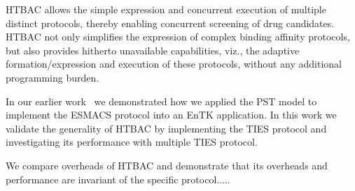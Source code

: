 HTBAC allows the simple expression and concurrent execution of multiple
distinct protocols, thereby enabling concurrent screening of drug candidates.
HTBAC not only simplifies the expression of complex binding affinity
protocols, but also provides hitherto unavailable capabilities, viz., the
adaptive formation/expression and execution of these protocols, without any
additional programming burden.

In our earlier work~\cite{dakka2017} we demonstrated how we applied the
PST model to implement the ESMACS protocol into an EnTK application. In this
work we validate the generality of HTBAC by implementing the TIES protocol and
investigating its performance with multiple TIES protocol. 


We compare overheads of HTBAC and demonstrate that its overheads and
performance are invariant of the specific protocol..... 








